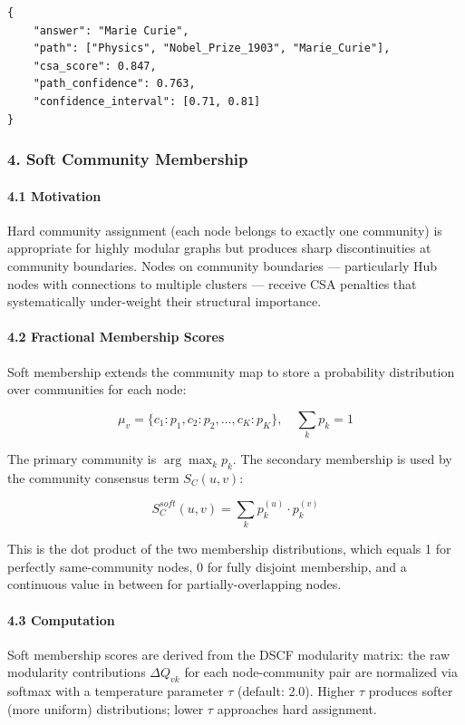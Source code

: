 \documentclass[10pt,journal,compsoc]{IEEEtran}
\begin{document}
\begin{lstlisting}
{
    "answer": "Marie Curie",
    "path": ["Physics", "Nobel_Prize_1903", "Marie_Curie"],
    "csa_score": 0.847,
    "path_confidence": 0.763,
    "confidence_interval": [0.71, 0.81]
}
\end{lstlisting}

\subsubsection{4. Soft Community Membership}

\paragraph{4.1 Motivation}
Hard community assignment (each node belongs to exactly one community) is appropriate for highly modular graphs but produces sharp disco\-ntinuities at community boundaries. Nodes on community boundaries — parti\-cularly Hub nodes with connections to multiple clusters — receive CSA penalties that syste\-matically under-weight their structural importance.

\paragraph{4.2 Fractional Membership Scores}
Soft membership extends the community map to store a probability distr\-ibution over communities for each node:

\begin{equation}
\mu_v = \{c_1: p_1, c_2: p_2, \ldots, c_K: p_K\}, \quad \sum_k p_k = 1
\end{equation}

The primary community is $\arg\max_k p_k$. The secondary membership is used by the community consensus term $S_C(u,v)$:

\begin{equation}
S_C^{soft}(u,v) = \sum_{k} p_k^{(u)} \cdot p_k^{(v)}
\end{equation}

This is the dot product of the two membership distr\-ibutions, which equals 1 for perfectly same-community nodes, 0 for fully disjoint membership, and a continuous value in between for partially-overlapping nodes.

\paragraph{4.3 Computation}
Soft membership scores are derived from the DSCF modularity matrix: the raw modularity contr\-ibutions $\Delta Q_{vk}$ for each node-community pair are normalized via softmax with a temperature parameter $\tau$ (default: 2.0). Higher $\tau$ produces softer (more uniform) distr\-ibutions; lower $\tau$ approaches hard assignment.
\end{document}
